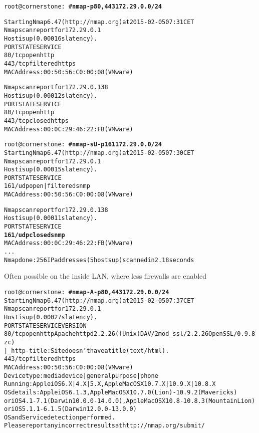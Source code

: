 \documentclass[Screen16to9,17pt]{foils}
\begin{document}

\begin{alltt}\small
root@cornerstone:~#{\bfseries  nmap -p80,443 172.29.0.0/24}

Starting Nmap 6.47 ( http://nmap.org ) at 2015-02-05 07:31 CET
Nmap scan report for 172.29.0.1
Host is up (0.00016s latency).
PORT    STATE    SERVICE
{\color{darkgreen}80/tcp  open     http}
443/tcp filtered https
MAC Address: 00:50:56:C0:00:08 (VMware)

Nmap scan report for 172.29.0.138
Host is up (0.00012s latency).
PORT    STATE  SERVICE
{\color{darkgreen}80/tcp  open   http}
443/tcp closed https
MAC Address: 00:0C:29:46:22:FB (VMware)

\end{alltt}


\begin{alltt}\small
root@cornerstone:~#{\bfseries nmap -sU -p 161 172.29.0.0/24}
Starting Nmap 6.47 ( http://nmap.org ) at 2015-02-05 07:30 CET
Nmap scan report for 172.29.0.1
Host is up (0.00015s latency).
PORT    STATE         SERVICE
{\color{darkgreen}161/udp open|filtered snmp}
MAC Address: 00:50:56:C0:00:08 (VMware)

Nmap scan report for 172.29.0.138
Host is up (0.00011s latency).
PORT    STATE  SERVICE
{\bf{161/udp closed snmp}}
MAC Address: 00:0C:29:46:22:FB (VMware)
...
Nmap done: 256 IP addresses (5 hosts up) scanned in 2.18 seconds
\end{alltt}

Often possible on the inside LAN, where less firewalls are enabled


\begin{alltt}\footnotesize
root@cornerstone:~#{\bfseries nmap -A -p80,443 172.29.0.0/24}
Starting Nmap 6.47 ( http://nmap.org ) at 2015-02-05 07:37 CET
Nmap scan report for 172.29.0.1
Host is up (0.00027s latency).
PORT    STATE    SERVICE VERSION
80/tcp  open     http    Apache httpd 2.2.26 ((Unix) DAV/2 mod_ssl/2.2.26 OpenSSL/0.9.8zc)
|_http-title: Site doesn't have a title (text/html).
443/tcp filtered https
MAC Address: 00:50:56:C0:00:08 (VMware)
Device type: media device|general purpose|phone
Running: Apple iOS 6.X|4.X|5.X, Apple Mac OS X 10.7.X|10.9.X|10.8.X
OS details: Apple iOS 6.1.3, Apple Mac OS X 10.7.0 (Lion) - 10.9.2 (Mavericks)
or iOS 4.1 - 7.1 (Darwin 10.0.0 - 14.0.0), Apple Mac OS X 10.8 - 10.8.3 (Mountain Lion)
or iOS 5.1.1 - 6.1.5 (Darwin 12.0.0 - 13.0.0)
OS and Service detection performed.
Please report any incorrect results at http://nmap.org/submit/
\end{alltt}
\end{document}
